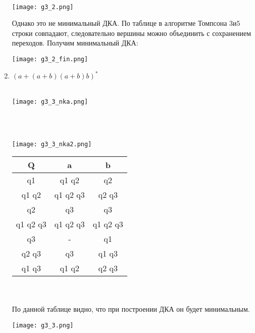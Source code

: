 \documentclass{article}
\begin{document}
\begin{enumerate}
    \\ 
    \begin{flushleft}
        \texttt{[image: g3\_2.png]}
    \end{flushleft}
    Однако это не минимальный ДКА. По таблице в алгоритме Томпсона $3 \text{и} 5$ строки совпадают, следовательно вершины можно объединить с сохранением переходов. Получим минимальный ДКА:
    \begin{flushleft}
        \texttt{[image: g3\_2\_fin.png]}
    \end{flushleft}
    \item {$(a + (a + b)(a + b)b)^*$} \\ \\
    \begin{flushleft}
        \texttt{[image: g3\_3\_nka.png]}
    \end{flushleft}
     \\ \\
    \begin{flushleft}
        \texttt{[image: g3\_3\_nka2.png]}
    \end{flushleft}
    \begin{tabular}{|c|c|c|}
        \hline
         Q              & a             & b         \\ \hline
         q1             & q1 q2         & q2        \\
         q1 q2          & q1 q2 q3      & q2 q3     \\
         q2             & q3            & q3        \\ 
         q1 q2 q3       & q1 q2 q3      & q1 q2 q3  \\
         q3             & -             & q1        \\ 
         q2 q3          & q3            & q1 q3     \\ 
         q1 q3          & q1 q2         & q2 q3     \\ \hline
    \end{tabular} \\ \\
    По данной таблице видно, что при построении ДКА он будет минимальным.
    \\ 
    \begin{flushleft}
        \texttt{[image: g3\_3.png]}

\end{flushleft}
\end{enumerate}
\end{document}
